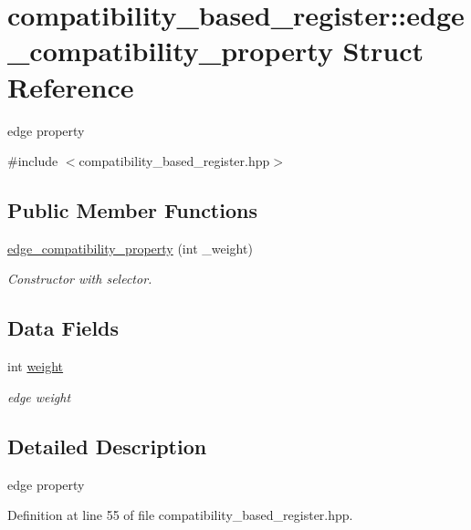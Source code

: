 \hypertarget{structcompatibility__based__register_1_1edge__compatibility__property}{}\section{compatibility\+\_\+based\+\_\+register\+:\+:edge\+\_\+compatibility\+\_\+property Struct Reference}
\label{structcompatibility__based__register_1_1edge__compatibility__property}


edge property  




{\ttfamily \#include $<$compatibility\+\_\+based\+\_\+register.\+hpp$>$}

\subsection*{Public Member Functions}
\begin{DoxyCompactItemize}
\item 
\hyperlink{structcompatibility__based__register_1_1edge__compatibility__property_a74a661bae2933fef260f988e05605457}{edge\+\_\+compatibility\+\_\+property} (int \+\_\+weight)
\begin{DoxyCompactList}\small\item\em Constructor with selector. \end{DoxyCompactList}\end{DoxyCompactItemize}
\subsection*{Data Fields}
\begin{DoxyCompactItemize}
\item 
int \hyperlink{structcompatibility__based__register_1_1edge__compatibility__property_a93dc7df8eb7a2a7632369f0f56d20cfc}{weight}
\begin{DoxyCompactList}\small\item\em edge weight \end{DoxyCompactList}\end{DoxyCompactItemize}


\subsection{Detailed Description}
edge property 

Definition at line 55 of file compatibility\+\_\+based\+\_\+register.\+hpp.



